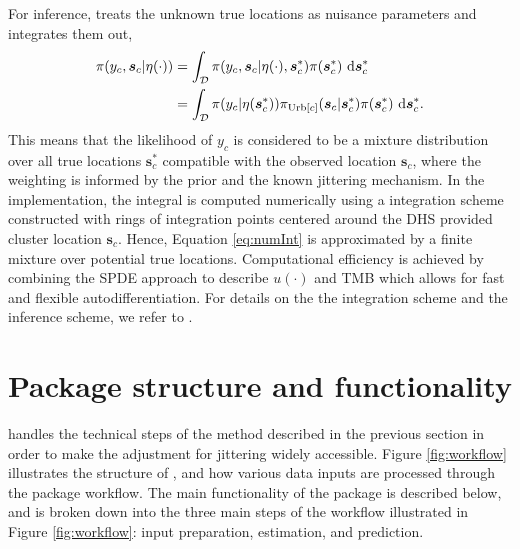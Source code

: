 For inference,  treats the unknown true locations as nuisance parameters and integrates them out,
\begin{align}
    \pi(y_c, \boldsymbol{s}_c|\eta(\cdot)) &= \int_{\mathcal{D}} \pi(y_c, \boldsymbol{s}_c| \eta(\cdot), \boldsymbol{s}_c^*) \pi(\boldsymbol{s}_c^*) \ \mathrm{d}\boldsymbol{s}_c^* \notag \\
    &= \int_{\mathcal{D}} \pi(y_c| \eta(\boldsymbol{s}_c^*)) \pi_{\mathrm{Urb}[c]}(\boldsymbol{s}_c| \boldsymbol{s}_c^*) \pi(\boldsymbol{s}_c^*) \ \mathrm{d}\boldsymbol{s}_c^*.\label{eq:numInt}
\end{align}
This means that the likelihood of $y_c$ is considered to be a mixture distribution over all true locations $\boldsymbol{s}_c^*$ compatible with the observed location $\boldsymbol{s}_c$, where the weighting is informed by the prior and the known jittering mechanism.
In the implementation, the integral is computed numerically  using a integration scheme constructed with rings of integration points centered around the DHS provided cluster location $\boldsymbol{s}_c$. Hence, Equation \eqref{eq:numInt} is approximated by a finite mixture over potential true locations. 
Computational efficiency is achieved by combining the SPDE approach \citep{Lindgren:etal:11} to describe $u(\cdot)$ and TMB which allows for fast and flexible autodifferentiation. For details on the the integration scheme and the inference scheme, we refer to \citet{altay2022accounting,altay2022covariates}.

\section{Package structure and functionality}
 handles the technical steps of the method described in the previous section in order to make the adjustment for jittering widely accessible.  Figure \ref{fig:workflow} illustrates the structure of , and how various data inputs are processed through the package workflow. The main functionality of the package is described below, and is broken down into the three main steps of the workflow illustrated in Figure \ref{fig:workflow}: input preparation, estimation, and prediction.

